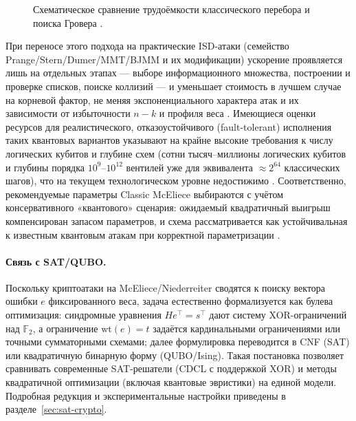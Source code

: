 \begin{figure}[H]
  \centering
  \caption{Схематическое сравнение трудоёмкости классического перебора и поиска Гровера \cite{Grover1996}.}
  \label{fig:grover-tikz}
\end{figure}


При переносе этого подхода на практические ISD-атаки (семейство Prange/Stern/Dumer/MMT/BJMM и их модификации) ускорение проявляется лишь на отдельных этапах — выборе информационного множества, построении и проверке списков, поиске коллизий — и уменьшает стоимость в лучшем случае на корневой фактор, не меняя экспоненциального характера атак и их зависимости от избыточности \(n-k\) и профиля веса \cite{Shintaro2024}. Имеющиеся оценки ресурсов для реалистического, отказоустойчивого (fault-tolerant) исполнения таких квантовых вариантов указывают на крайне высокие требования к числу логических кубитов и глубине схем (сотни тысяч–миллионы логических кубитов и глубины порядка \(10^{9}\)–\(10^{12}\) вентилей уже для эквивалента \(\approx 2^{64}\) классических шагов), что на текущем технологическом уровне недостижимо \cite{Shintaro2024}. Соответственно, рекомендуемые параметры Classic McEliece выбираются с учётом консервативного «квантового» сценария: ожидаемый квадратичный выигрыш компенсирован запасом параметров, и схема рассматривается как устойчивальная к известным квантовым атакам при корректной параметризации \cite{ClassicMcEliece2020}.






\paragraph{Связь с SAT/QUBO.}
Поскольку криптоатаки на McEliece/Niederreiter сводятся к поиску вектора ошибки \(e\) фиксированного веса, задача естественно формализуется как булева оптимизация: синдромные уравнения \(He^{\top}=s^{\top}\) дают систему XOR-ограничений над \(\mathbb{F}_2\), а ограничение \(\mathrm{wt}(e)=t\) задаётся кардинальными ограничениями или точными сумматорными схемами; далее формулировка переводится в CNF (SAT) или квадратичную бинарную форму (QUBO/Ising). Такая постановка позволяет сравнивать современные SAT-решатели (CDCL с поддержкой XOR) и методы квадратичной оптимизации (включая квантовые эвристики) на единой модели. Подробная редукция и экспериментальные настройки приведены в разделе~\ref{sec:sat-crypto}.


